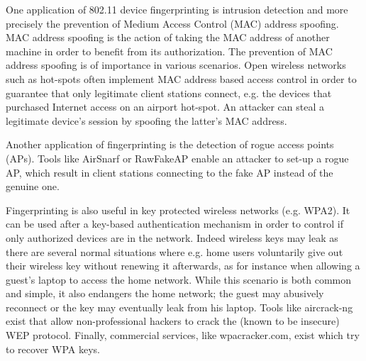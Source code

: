 \documentclass[10pt, conference, compsocconf, letterpaper]{IEEEtran}
\begin{document}
One application of 802.11 device fingerprinting is intrusion detection and more precisely
the prevention of Medium Access Control (MAC) address spoofing. 
MAC address spoofing is the action of taking the MAC address of another machine in order to 
benefit from its authorization. The prevention of MAC address spoofing is of importance in various scenarios.
Open wireless networks such as hot-spots often implement MAC address based access control in order
to guarantee that only legitimate client stations connect, e.g. the devices that purchased Internet access 
on an airport hot-spot.
An attacker can steal a legitimate device's session by spoofing the latter's MAC address.

Another application of fingerprinting is the detection of rogue access points (APs). 
Tools like AirSnarf 
or RawFakeAP 
enable an attacker to set-up a rogue AP, which result in client stations connecting to the fake AP instead of the genuine one.

Fingerprinting is also useful in key protected wireless networks (e.g. WPA2).
It can be used after a key-based authentication mechanism in order to control if only authorized devices are in the network.
Indeed wireless keys may leak as there are several normal situations where 
e.g. home users voluntarily give out their wireless key without renewing it afterwards, as
for instance when allowing a guest's laptop to access the home network.
While this scenario is both common and simple, it also endangers the home network;
the guest may abusively reconnect or the key may eventually leak from his laptop.
Tools like aircrack-ng exist that allow non-professional hackers to crack the (known to be insecure) WEP protocol.
Finally, commercial services, like wpacracker.com, exist which try to recover WPA keys. 
\end{document}
